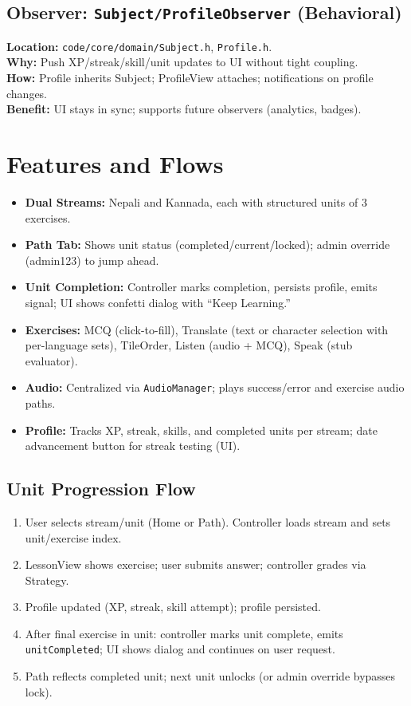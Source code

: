 \documentclass{article}
\begin{document}
\subsection{Observer: \texttt{Subject/ProfileObserver} (Behavioral)}
\textbf{Location:} \texttt{code/core/domain/Subject.h}, \texttt{Profile.h}.\\
\textbf{Why:} Push XP/streak/skill/unit updates to UI without tight coupling.\\
\textbf{How:} Profile inherits Subject; ProfileView attaches; notifications on profile changes.\\
\textbf{Benefit:} UI stays in sync; supports future observers (analytics, badges).

\section{Features and Flows}
\begin{itemize}
  \item \textbf{Dual Streams:} Nepali and Kannada, each with structured units of 3 exercises.
  \item \textbf{Path Tab:} Shows unit status (completed/current/locked); admin override (admin123) to jump ahead.
  \item \textbf{Unit Completion:} Controller marks completion, persists profile, emits signal; UI shows confetti dialog with “Keep Learning.”
  \item \textbf{Exercises:} MCQ (click-to-fill), Translate (text or character selection with per-language sets), TileOrder, Listen (audio + MCQ), Speak (stub evaluator).
  \item \textbf{Audio:} Centralized via \texttt{AudioManager}; plays success/error and exercise audio paths.
  \item \textbf{Profile:} Tracks XP, streak, skills, and completed units per stream; date advancement button for streak testing (UI).
\end{itemize}

\subsection{Unit Progression Flow}
\begin{enumerate}[label=\textbf{\arabic*.}]
  \item User selects stream/unit (Home or Path). Controller loads stream and sets unit/exercise index.
  \item LessonView shows exercise; user submits answer; controller grades via Strategy.
  \item Profile updated (XP, streak, skill attempt); profile persisted.
  \item After final exercise in unit: controller marks unit complete, emits \texttt{unitCompleted}; UI shows dialog and continues on user request.
  \item Path reflects completed unit; next unit unlocks (or admin override bypasses lock).
\end{enumerate}
\end{document}
